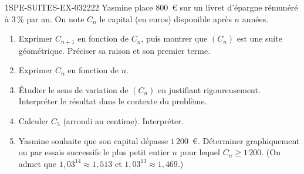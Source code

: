 \begin{exercice}{1SPE-SUITES-EX-032}{2}{22}
Yasmine place $800$~\euro{} sur un livret d'épargne rémunéré à $3\,\%$ par an. On note $C_n$ le capital (en euros) disponible après $n$ années.

\begin{enumerate}
  \item Exprimer $C_{n+1}$ en fonction de $C_n$, puis montrer que $(C_n)$ est une suite géométrique. Préciser sa raison et son premier terme.

  \item Exprimer $C_n$ en fonction de $n$.

  \item Étudier le sens de variation de $(C_n)$ en justifiant rigoureusement. Interpréter le résultat dans le contexte du problème.

  \item Calculer $C_5$ (arrondi au centime). Interpréter.

  \item Yasmine souhaite que son capital dépasse $1\,200$~\euro{}. Déterminer graphiquement ou par essais successifs le plus petit entier $n$ pour lequel $C_n \geq 1\,200$. (On admet que $1{,}03^{14} \approx 1{,}513$ et $1{,}03^{13} \approx 1{,}469$.)
\end{enumerate}
\end{exercice}
